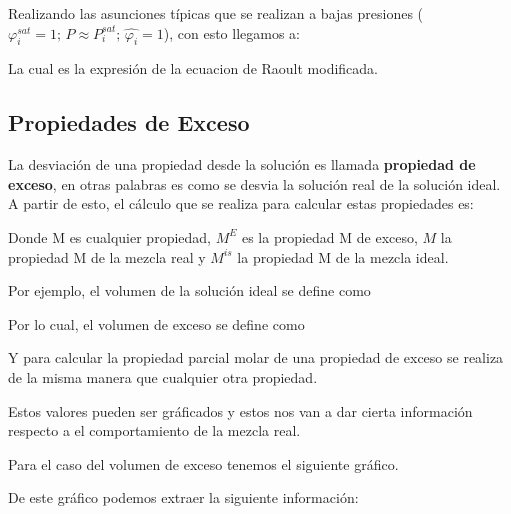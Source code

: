 Realizando las asunciones típicas que se realizan a bajas presiones ($\varphi_i^{sat}=1;\, P\approx P^{sat}_i;\, \hat{\varphi_i}=1$), con esto llegamos a:

La cual es la expresión de la ecuacion de Raoult modificada.

\subsection{Propiedades de Exceso}

La desviación de una propiedad desde la solución es llamada \textbf{propiedad de exceso}, en otras palabras es como se desvia la solución real de la solución ideal. A partir de esto, el cálculo que se realiza 
para calcular estas propiedades es:


Donde M es cualquier propiedad, $M^E$ es la propiedad M de exceso, $M$ la propiedad M de la mezcla real y $M^{is}$ la propiedad M de la mezcla ideal.

Por ejemplo, el volumen de la solución ideal se define como 

Por lo cual, el volumen de exceso se define como

Y para calcular la propiedad parcial molar de una propiedad de exceso se realiza de la misma manera que cualquier otra propiedad.


Estos valores pueden ser gráficados y estos nos van a dar cierta información respecto a el comportamiento de la mezcla real.

Para el caso del volumen de exceso tenemos el siguiente gráfico.


De este gráfico podemos extraer la siguiente información:

